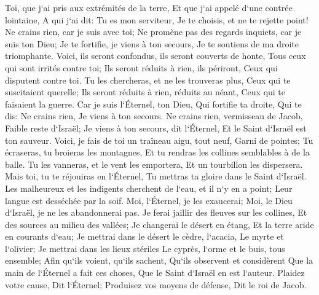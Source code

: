 \verse Toi, que j`ai pris aux extrémités de la terre, Et que j`ai appelé d`une contrée lointaine, A qui j`ai dit: Tu es mon serviteur, Je te choisis, et ne te rejette point! 
\verse Ne crains rien, car je suis avec toi; Ne promène pas des regards inquiets, car je suis ton Dieu; Je te fortifie, je viens à ton secours, Je te soutiens de ma droite triomphante. 
\verse Voici, ils seront confondus, ils seront couverts de honte, Tous ceux qui sont irrités contre toi; Ils seront réduits à rien, ils périront, Ceux qui disputent contre toi. 
\verse Tu les chercheras, et ne les trouveras plus, Ceux qui te suscitaient querelle; Ils seront réduits à rien, réduits au néant, Ceux qui te faisaient la guerre. 
\verse Car je suis l`Éternel, ton Dieu, Qui fortifie ta droite, Qui te dis: Ne crains rien, Je viens à ton secours. 
\verse Ne crains rien, vermisseau de Jacob, Faible reste d`Israël; Je viens à ton secours, dit l`Éternel, Et le Saint d`Israël est ton sauveur. 
\verse Voici, je fais de toi un traîneau aigu, tout neuf, Garni de pointes; Tu écraseras, tu broieras les montagnes, Et tu rendras les collines semblables à de la balle. 
\verse Tu les vanneras, et le vent les emportera, Et un tourbillon les dispersera. Mais toi, tu te réjouiras en l`Éternel, Tu mettras ta gloire dans le Saint d`Israël. 
\verse Les malheureux et les indigents cherchent de l`eau, et il n`y en a point; Leur langue est desséchée par la soif. Moi, l`Éternel, je les exaucerai; Moi, le Dieu d`Israël, je ne les abandonnerai pas. 
\verse Je ferai jaillir des fleuves sur les collines, Et des sources au milieu des vallées; Je changerai le désert en étang, Et la terre aride en courants d`eau; 
\verse Je mettrai dans le désert le cèdre, l`acacia, Le myrte et l`olivier; Je mettrai dans les lieux stériles Le cyprès, l`orme et le buis, tous ensemble; 
\verse Afin qu`ils voient, qu`ils sachent, Qu`ils observent et considèrent Que la main de l`Éternel a fait ces choses, Que le Saint d`Israël en est l`auteur. 
\verse Plaidez votre cause, Dit l`Éternel; Produisez vos moyens de défense, Dit le roi de Jacob. 

